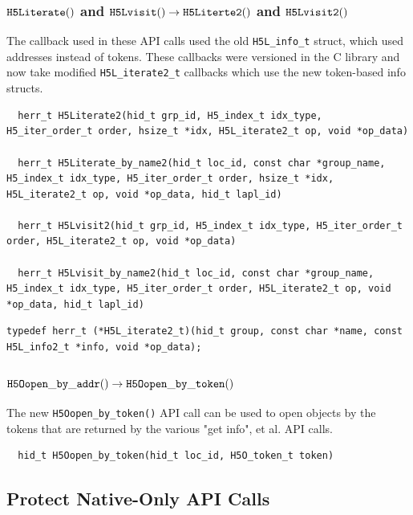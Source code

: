 \subsubsection{${\tt H5Literate()}$ and ${\tt H5Lvisit()}\rightarrow {\tt H5Literte2()}$ and ${\tt H5Lvisit2()}$}

The callback used in these API calls used the old {\tt H5L\_info\_t} struct, which
used addresses instead of tokens. These callbacks were versioned in the C library
and now take modified {\tt H5L\_iterate2\_t} callbacks which use the new token-based
info structs.

\begin{lstlisting}
  herr_t H5Literate2(hid_t grp_id, H5_index_t idx_type, H5_iter_order_t order, hsize_t *idx, H5L_iterate2_t op, void *op_data)

  herr_t H5Literate_by_name2(hid_t loc_id, const char *group_name, H5_index_t idx_type, H5_iter_order_t order, hsize_t *idx, H5L_iterate2_t op, void *op_data, hid_t lapl_id)

  herr_t H5Lvisit2(hid_t grp_id, H5_index_t idx_type, H5_iter_order_t order, H5L_iterate2_t op, void *op_data)

  herr_t H5Lvisit_by_name2(hid_t loc_id, const char *group_name, H5_index_t idx_type, H5_iter_order_t order, H5L_iterate2_t op, void *op_data, hid_t lapl_id)
\end{lstlisting}

\begin{lstlisting}
typedef herr_t (*H5L_iterate2_t)(hid_t group, const char *name, const H5L_info2_t *info, void *op_data); 
\end{lstlisting}


\subsubsection{${\tt H5Oopen\_by\_addr()} \rightarrow {\tt H5Oopen\_by\_token()}$}

The new {\tt H5Oopen\_by\_token()} API call can be used to open objects by the tokens that are returned by the various "get info", et al. API calls.

\begin{lstlisting}
  hid_t H5Oopen_by_token(hid_t loc_id, H5O_token_t token)
\end{lstlisting}


\subsection{Protect Native-Only API Calls}

